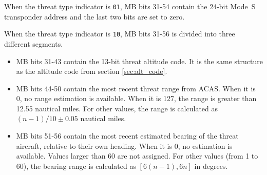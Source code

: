 When the threat type indicator is \texttt{01}, MB bits 31-54 contain the 24-bit Mode~S transponder address and the last two bits are set to zero.

When the threat type indicator is \texttt{10}, MB bits 31-56 is divided into three different segments.

\begin{itemize}
  \item MB bits 31-43 contain the 13-bit threat altitude code. It is the same structure as the altitude code from section \ref{sec:alt_code}.
  \item MB bits 44-50 contain the most recent threat range from ACAS. When it is 0, no range estimation is available. When it is 127, the range is greater than 12.55 nautical miles. For other values, the range is calculated as $(n-1) / 10 \pm 0.05$ nautical miles.
  \item MB bits 51-56 contain the most recent estimated bearing of the threat aircraft, relative to their own heading. When it is 0, no estimation is available. Values larger than 60 are not assigned. For other values (from 1 to 60), the bearing range is calculated as $[6(n-1), 6n]$ in degrees.
\end{itemize}
